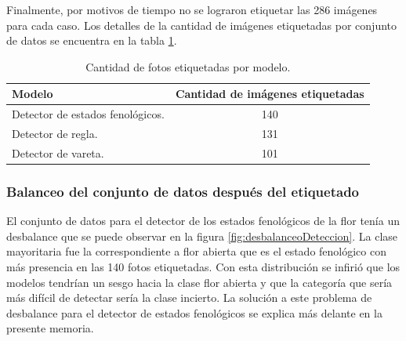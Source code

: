 Finalmente, por motivos de tiempo no se lograron etiquetar las 286 imágenes para cada caso. Los detalles de la cantidad de imágenes etiquetadas por conjunto de datos se encuentra en la tabla \ref{tab:etiquetado}. 

\begin{table}[h]
	\centering
	\caption{Cantidad de fotos etiquetadas por modelo.}
	\begin{tabular}{l c }    
		\toprule
		\textbf{Modelo}     & \textbf{Cantidad de imágenes etiquetadas} \\
		\midrule
		Detector de estados fenológicos.                  & 140 \\
		Detector de regla.                  & 131 \\
		Detector de vareta.                  & 101 \\		
		\bottomrule
		\hline
	\end{tabular}
	\label{tab:etiquetado}
\end{table}

\subsubsection{Balanceo del conjunto de datos después del etiquetado}
\label{desbalanceAfterLabeled}

El conjunto de datos para el detector de los estados fenológicos de la flor tenía un desbalance que se puede observar en la figura \ref{fig:desbalanceoDeteccion}. La clase mayoritaria fue la correspondiente a flor abierta que es el estado fenológico con más presencia en las 140 fotos etiquetadas. Con esta distribución se infirió que los modelos tendrían un sesgo hacia la clase flor abierta y que la categoría que sería más difícil de detectar sería la clase incierto. La solución a este problema de desbalance para el detector de estados fenológicos se explica más delante en la presente memoria.

